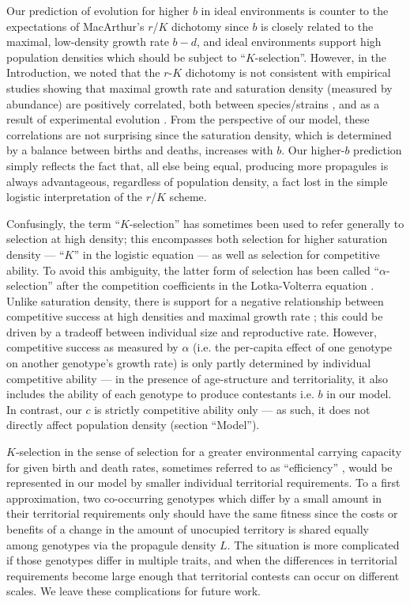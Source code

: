 \documentclass[11pt]{article}
\begin{document}
Our prediction of evolution for higher $b$ in ideal environments is counter to the expectations of MacArthur's $r$/$K$ dichotomy \citep{macarthur_1962} since $b$ is closely related to the maximal, low-density growth rate $b-d$, and ideal environments support high population densities which should be subject to ``$K$-selection''. However, in the Introduction, we noted that the $r$-$K$ dichotomy is not consistent with empirical studies showing that maximal growth rate and saturation density (measured by abundance) are positively correlated, both between species/strains \citep{luckinbill_1979,kuno_1991,hendriks_2005,fitzsimmons_2010}, and as a result of experimental evolution \citep{luckinbill_1978,luckinbill_1979}. From the perspective of our model, these correlations are not surprising since the saturation density, which is determined by a balance between births and deaths, increases with $b$. Our higher-$b$ prediction simply reflects the fact that, all else being equal, producing more propagules is always advantageous, regardless of population density, a fact lost in the simple logistic interpretation of the $r$/$K$ scheme. 

Confusingly, the term ``$K$-selection'' has sometimes been used to refer generally to selection at high density; this encompasses both selection for higher saturation density --- ``$K$'' in the logistic equation --- as well as selection for competitive ability. To avoid this ambiguity, the latter form of selection has been called ``$\alpha$-selection'' after the competition coefficients in the Lotka-Volterra equation \citep{gill_1974,case_1974,joshi_2001}. Unlike saturation density, there is support for a negative relationship between competitive success at high densities and maximal growth rate \cite{luckinbill_1979}; this could be driven by a tradeoff between individual size and reproductive rate. However, competitive success as measured by $\alpha$ (i.e. the per-capita effect of one genotype on another genotype's growth rate) is only partly determined by individual competitive ability --- in the presence of age-structure and territoriality, it also includes the ability of each genotype to produce contestants i.e. $b$ in our model. In contrast, our $c$ is strictly competitive ability only --- as such, it does not directly affect population density (section ``Model'').

$K$-selection in the sense of selection for a greater environmental carrying capacity for given birth and death rates, sometimes referred to as ``efficiency'' \citep{macarthur_1962}, would be represented in our model by smaller individual territorial requirements. To a first approximation, two co-occurring genotypes which differ by a small amount in their territorial requirements only should have the same fitness since the costs or benefits of a change in the amount of unocupied territory is shared equally among genotypes via the propagule density $L$. The situation is more complicated if those genotypes differ in multiple traits, and when the differences in territorial requirements become large enough that territorial contests can occur on different scales. We leave these complications for future work. 
\end{document}

